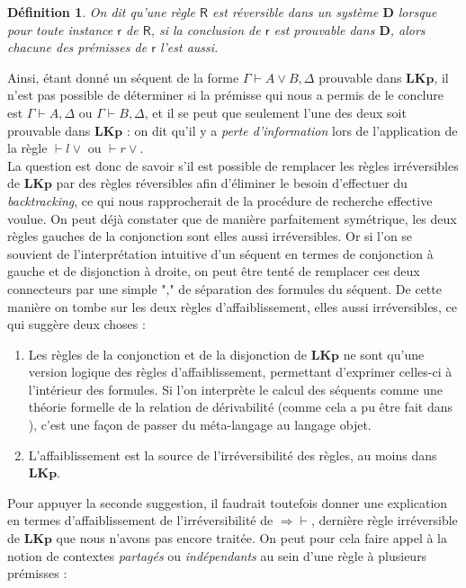 \documentclass[12pt]{report}
\newcommand{\lto}{\Rightarrow}
\newcommand{\seq}{\vdash}
\newcommand{\irule}[1]{\footnotesize$#1$}
\newcommand{\iruleL}[1]{\irule{{#1}\seq}}
\newcommand{\iruleR}[1]{\irule{\seq{#1}}}
\newtheorem{definition}{Définition}
\begin{document}
\begin{definition}
    On dit qu'une règle $\mathsf{R}$ est \emph{réversible} dans un système $\mathbf{D}$ lorsque pour toute instance $\mathsf{r}$ de $\mathsf{R}$, si la conclusion de $\mathsf{r}$ est prouvable dans $\mathbf{D}$, alors chacune des prémisses de $\mathsf{r}$ l'est aussi.
\end{definition}

Ainsi, étant donné un séquent de la forme $\Gamma \seq A \lor B,\Delta$ prouvable dans $\mathbf{LKp}$, il n'est pas possible de déterminer si la prémisse qui nous a permis de le conclure est $\Gamma \seq A,\Delta$ ou $\Gamma \seq B,\Delta$, et il se peut que seulement l'une des deux soit prouvable dans $\mathbf{LKp}$ : on dit qu'il y a \emph{perte d'information} lors de l'application de la règle {\iruleR{l\lor}} ou {\iruleR{r\lor}}.\\

La question est donc de savoir s'il est possible de remplacer les règles irréversibles de $\mathbf{LKp}$ par des règles réversibles afin d'éliminer le besoin d'effectuer du \emph{backtracking}, ce qui nous rapprocherait de la procédure de recherche effective voulue. On peut déjà constater que de manière parfaitement symétrique, les deux règles gauches de la conjonction sont elles aussi irréversibles. Or si l'on se souvient de l'interprétation intuitive d'un séquent en termes de conjonction à gauche et de disjonction à droite, on peut être tenté de remplacer ces deux connecteurs par une simple "," de séparation des formules du séquent. De cette manière on tombe sur les deux règles d'affaiblissement, elles aussi irréversibles, ce qui suggère deux choses :

\begin{enumerate}
    \item Les règles de la conjonction et de la disjonction de $\mathbf{LKp}$ ne sont qu'une version logique des règles d'affaiblissement, permettant d'exprimer celles-ci à l'intérieur des formules. Si l'on interprète le calcul des séquents comme une théorie formelle de la relation de dérivabilité (comme cela a pu être fait dans \cite{vPN01}), c'est une façon de passer du méta-langage au langage objet.
    \item L'affaiblissement est la source de l'irréversibilité des règles, au moins dans $\mathbf{LKp}$.
\end{enumerate}

Pour appuyer la seconde suggestion, il faudrait toutefois donner une explication en termes d'affaiblissement de l'irréversibilité de {\iruleL{\lto}}, dernière règle irréversible de $\mathbf{LKp}$ que nous n'avons pas encore traitée. On peut pour cela faire appel à la notion de contextes \emph{partagés} ou \emph{indépendants} au sein d'une règle à plusieurs prémisses :
\end{document}
